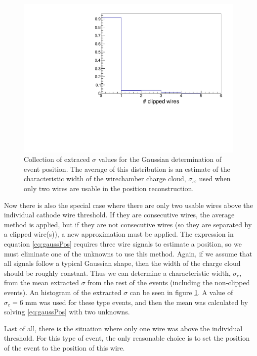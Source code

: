 \begin{figure}[h]
  \centering
  \includegraphics[scale=0.5,page=7]{4-UCNACalibrations/mwpc_position.pdf} 
  \caption{Collection of extraced $\sigma$ values for the Gaussian determination of event position. The
    average of this distribution is an estimate of the characteristic width of the wirechamber charge cloud,
    $\sigma_c$, used when only two wires are usable in the position reconstruction.}
  \label{fig:meanSigma}
\end{figure}

Now there is also the special case where there are only two usable wires above the individual cathode
wire threshold. If they are consecutive wires, the average method is applied, but if they are not consecutive wires
(so they are separated by a clipped wire(s)), a new approximation must be applied. The expression in
equation \ref{eq:gaussPos} requires three wire signals to estimate a position, so we must eliminate one of the unknowns
to use this method. Again, if we assume that all signals follow a typical Gaussian shape, then the width of the
charge cloud should be roughly constant. Thus we can determine a characteristic width, $\sigma_c$, from the
mean extracted $\sigma$ from the rest of the events (including the non-clipped events). An histogram of the
extracted $\sigma$ can be seen in figure \ref{fig:meanSigma}. A value of $\sigma_c = 6\text{~mm}$ was used
for these type events, and then the mean was calculated by solving \ref{eq:gaussPos} with two unknowns.

Last of all, there is the situation where only one wire was above the individual threshold. For this type of event,
the only reasonable choice is to set the position of the event to the position of this wire.

